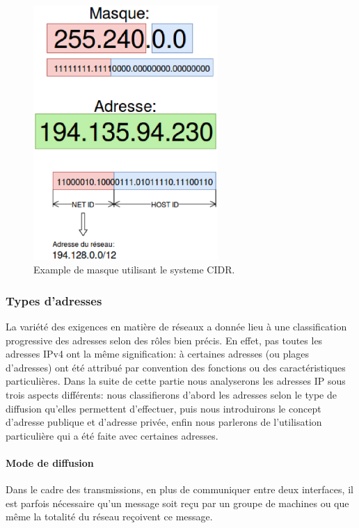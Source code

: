 \begin{figure}
\centering
\includegraphics[width=7cm]{./pics/maskipv4cidr.eps}
\caption{Example de masque utilisant le systeme CIDR.}
\label{fig:exmask}
\end{figure}


\subsubsection{Types d'adresses}
La variété des exigences en matière de réseaux a donnée lieu à une
classification progressive des adresses selon des rôles bien précis. En effet,
pas toutes les adresses IPv4 ont la même signification: à certaines adresses
(ou plages d'adresses) ont été attribué par convention des fonctions ou des
caractéristiques particulières.  Dans la suite de cette partie nous analyserons les
adresses IP sous trois aspects différents: nous classifierons d'abord les adresses selon
le type de diffusion qu'elles permettent d'effectuer, puis nous introduirons le
concept d'adresse publique et d'adresse privée, enfin nous parlerons de l'utilisation
particulière qui a été faite avec certaines adresses.



\paragraph{Mode de diffusion}
Dans le cadre des transmissions, en plus de communiquer entre deux interfaces, il est 
parfois nécessaire qu'un message soit reçu par un groupe de machines ou que 
même la totalité du réseau reçoivent ce message.

